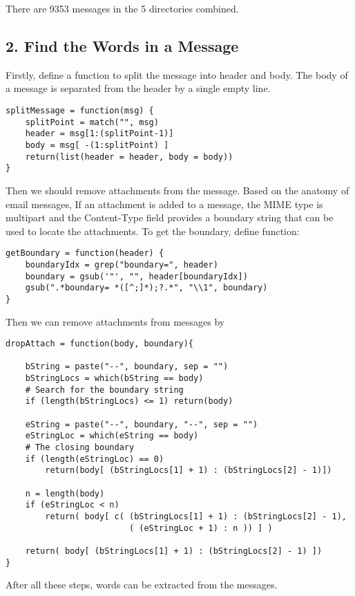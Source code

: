 \documentclass{article}
\begin{document}
There are 9353 messages in the 5 directories combined.

\subsection*{2. Find the Words in a Message}
Firstly, define a function to split the message into header and body. The body of a message is separated from the header by a single empty line. 
\begin{verbatim}
splitMessage = function(msg) {
    splitPoint = match("", msg)
    header = msg[1:(splitPoint-1)]
    body = msg[ -(1:splitPoint) ]
    return(list(header = header, body = body))
}
\end{verbatim}

Then we should remove attachments from the message. Based on the anatomy of email messages, If an attachment is added to a message, the MIME type is multipart and the Content-Type field provides a boundary string that can be used to locate the attachments. To get the boundary, define function:

\begin{verbatim}
getBoundary = function(header) {
    boundaryIdx = grep("boundary=", header)
    boundary = gsub('"', "", header[boundaryIdx])
    gsub(".*boundary= *([^;]*);?.*", "\\1", boundary)
}
\end{verbatim}
Then we can remove attachments from messages by
\begin{verbatim}
dropAttach = function(body, boundary){
    
    bString = paste("--", boundary, sep = "")
    bStringLocs = which(bString == body)
    # Search for the boundary string
    if (length(bStringLocs) <= 1) return(body)
    
    eString = paste("--", boundary, "--", sep = "")
    eStringLoc = which(eString == body)
    # The closing boundary
    if (length(eStringLoc) == 0) 
        return(body[ (bStringLocs[1] + 1) : (bStringLocs[2] - 1)])
    
    n = length(body)
    if (eStringLoc < n) 
        return( body[ c( (bStringLocs[1] + 1) : (bStringLocs[2] - 1), 
                         ( (eStringLoc + 1) : n )) ] )
    
    return( body[ (bStringLocs[1] + 1) : (bStringLocs[2] - 1) ])
}
\end{verbatim}

After all these steps, words can be extracted from the messages.
\end{document}
